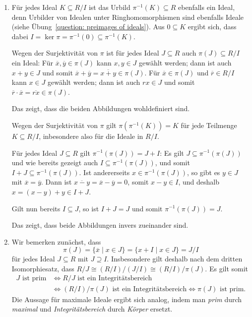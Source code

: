 \begin{solution}
  \begin{enumerate}
    \item
      Für jedes Ideal $K \subseteq R/I$ ist das Urbild $\pi^{-1}(K) \subseteq R$ ebenfalls ein Ideal, denn Urbilder von Idealen unter Ringhomomorphismen sind ebenfalls Ideale (siehe Übung~\ref{question: preimages of ideals}).
      Aus $0 \subseteq K$ ergibt sich, dass dabei $I = \ker \pi = \pi^{-1}(0) \subseteq \pi^{-1}(K)$.
      
      Wegen der Surjektivität von $\pi$ ist für jedes Ideal $J \subseteq R$ auch $\pi(J) \subseteq R/I$ ein Ideal:
      Für $\overline{x}, \overline{y} \in \pi(J)$ kann $x, y \in J$ gewählt werden;
      dann ist auch $x + y \in J$ und somit $\overline{x} + \overline{y} = \overline{x + y} \in \pi(J)$.
      Für $\overline{x} \in \pi(J)$ und $\overline{r} \in R/I$ kann $x \in J$ gewählt werden;
      dann ist auch $r x \in J$ und somit $\overline{r} \cdot \overline{x} = \overline{r x} \in \pi(J)$.
      
      Das zeigt, dass die beiden Abbildungen wohldefiniert sind.
      
      Wegen der Surjektivität von $\pi$ gilt $\pi(\pi^{-1}(K)) = K$ für jede Teilmenge $K \subseteq R/I$, inbesondere also für die Ideale in $R/I$.
      
      Für jedes Ideal $J \subseteq R$ gilt $\pi^{-1}(\pi(J)) = J + I$:
      Es gilt $J \subseteq \pi^{-1}(\pi(J))$ und wie bereits gezeigt auch $I \subseteq \pi^{-1}(\pi(J))$, und somit $I + J \subseteq \pi^{-1}(\pi(J))$.
      Ist andererseits $x \in \pi^{-1}(\pi(J))$, so gibt es $y \in J$ mit $\overline{x} = \overline{y}$.
      Dann ist $\overline{x-y} = \overline{x} - \overline{y} = 0$, somit $x - y \in I$, und deshalb $x = (x-y) + y \in I + J$.
      
      Gilt nun bereits $I \subseteq J$, so ist $I + J = J$ und somit $\pi^{-1}(\pi(J)) = J$.
      
      Das zeigt, dass beide Abbildungen invers zueinander sind.
    \item
      Wir bemerken zunächst, dass
      \[
          \pi(J)
        = \{ \overline{x} \mid x \in J \}
        = \{ x + I \mid x \in J \}
        = J/I
      \]
      für jedes Ideal $J \subseteq R$ mit $J \supseteq I$.
      Insbesondere gilt deshalb nach dem dritten Isomorphiesatz, dass $R/J \cong (R/I)/(J/I) \cong (R/I)/\pi(J)$.
      Es gilt somit
      \begin{align*}
              \text{$J$ ist prim}
        &\iff \text{$R/J$ ist ein Integritätsbereich}
        \\
        &\iff \text{$(R/I)/\pi(J)$ ist ein Integritätsbereich}
         \iff \text{$\pi(J)$ ist prim}.
      \end{align*}
      Die Aussage für maximale Ideale ergibt sich analog, indem man \emph{prim} durch \emph{maximal} und \emph{Integritätsbereich} durch \emph{Körper} ersetzt.
  \end{enumerate}
\end{solution}



